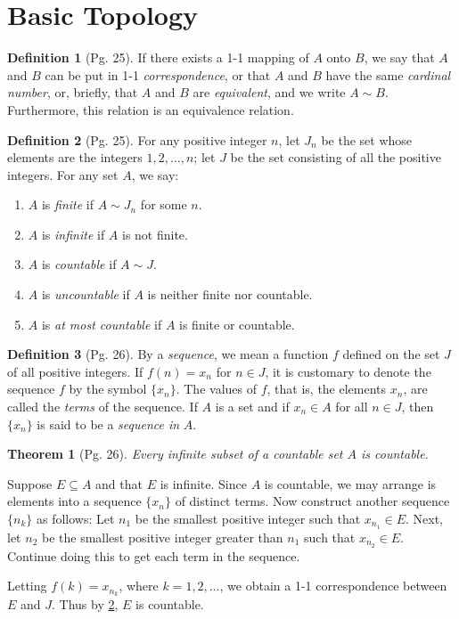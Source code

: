 \documentclass[leqno]{article}
\makeatletter
\newtheorem{theorem}{Theorem}[section]
\theoremstyle{definition}
\newtheorem{definition}{Definition}[section]
\theoremstyle{remark}
\let\oldproofname=\proofname
\renewcommand{\proofname}{\bf{\textit{\oldproofname}}}
\renewenvironment{proof}[1][\proofname]{\par
  \pushQED{\qed}%
  \normalfont \topsep6\p@\@plus6\p@\relax
  \list{}{\leftmargin=0mm
          \rightmargin=0mm
          \settowidth{\itemindent}{\itshape#1}%
          \labelwidth=4mm
          \parsep=0pt \listparindent=0mm%
  }
  \item[\hskip\labelsep
        \itshape
    #1\@addpunct{.}]\ignorespaces
}{%
  \popQED\endlist\@endpefalse
}
\makeatother
\begin{document}
    \section{Basic Topology}
        \begin{definition}[Pg. 25]\label{def:4.1}
            If there exists a 1-1 mapping of $A$ onto $B$, we say that $A$ and $B$ can be put in 1-1 \emph{correspondence}, or that $A$ and $B$ have the same \emph{cardinal number}, or, briefly, that $A$ and $B$ are \emph{equivalent}, and we write $A\sim B$. Furthermore, this relation is an equivalence relation. \cite{rud}
        \end{definition}
        \begin{definition}[Pg. 25]\label{def:4.2}
            For any positive integer $n$, let $J_n$ be the set whose elements are the integers $1,2,\dots,n$; let $J$ be the set consisting of all the positive integers. For any set $A$, we say:
                \begin{enumerate}[label=(\alph*)]
                    \item $A$ is \emph{finite} if $A\sim J_n$ for some $n$.
                    \item $A$ is \emph{infinite} if $A$ is not finite. 
                    \item $A$ is \emph{countable} if $A\sim J$.
                    \item $A$ is \emph{uncountable} if $A$ is neither finite nor countable.
                    \item $A$ is \emph{at most countable} if $A$ is finite or countable. \cite{rud}
                \end{enumerate}
        \end{definition}
        \begin{definition}[Pg. 26]\label{def:4.3}
            By a \emph{sequence}, we mean a function $f$ defined on the set $J$ of all positive integers. If $f(n)=x_n$ for $n\in J$, it is customary to denote the sequence $f$ by the symbol $\{x_n\}$. The values of $f$, that is, the elements $x_n$, are called the \emph{terms} of the sequence. If $A$ is a set and if $x_n\in A$ for all $n\in J$, then $\{x_n\}$ is said to be a \emph{sequence in} $A$. \cite{rud}
        \end{definition}
        \begin{theorem}[Pg. 26]\label{thm:4.1}
            Every infinite subset of a countable set $A$ is countable.
        \end{theorem}
            \begin{proof}
                Suppose $E\subseteq A$ and that $E$ is infinite. Since $A$ is countable, we may arrange is elements into a sequence $\{x_n\}$ of distinct terms. Now construct another sequence $\{n_k\}$ as follows: Let $n_1$ be the smallest positive integer such that $x_{n_1}\in E$. Next, let $n_2$ be the smallest positive integer greater than $n_1$ such that $x_{n_2}\in E$. Continue doing this to get each term in the sequence.\par\hspace{4mm} Letting $f(k)=x_{n_k}$, where $k=1,2,\dots$, we obtain a 1-1 correspondence between $E$ and $J$. Thus by \cref{def:4.2}, $E$ is countable.
            \end{proof}
\end{document}
